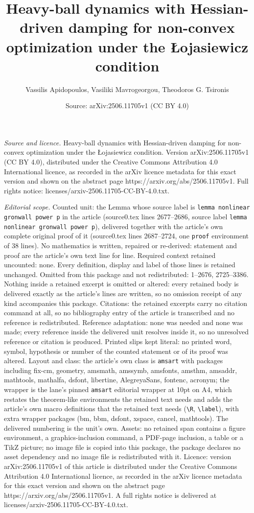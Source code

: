 \documentclass[10pt,a4paper]{amsart}
\title[Heavy-ball dynamics with Hessian-driven damping for non-conv]{Heavy-ball dynamics with Hessian-driven damping for non-convex optimization under the {\L}ojasiewicz condition}
\author{Vassilis Apidopoulos, Vasiliki Mavrogeorgou, Theodoros G. Tsironis}
\date{Source: arXiv:2506.11705v1 (CC BY 4.0)}
\begin{document}
\maketitle

\noindent\emph{Source and licence.} Heavy-ball dynamics with Hessian-driven damping for non-convex optimization under the {\L}ojasiewicz condition. Version arXiv:2506.11705v1 (CC BY 4.0), distributed under the Creative Commons Attribution 4.0 International licence, as recorded in the arXiv licence metadata for this exact version and shown on the abstract page https://arxiv.org/abs/2506.11705v1. Full rights notice: licenses/arxiv-2506.11705-CC-BY-4.0.txt.\par\smallskip

\noindent\textit{Editorial scope.} Counted unit: the Lemma whose source label is \texttt{lemma nonlinear gronwall power p} in the article (source0.tex lines 2677--2686, source label \texttt{lemma nonlinear gronwall power p}), delivered together with the article's own complete original proof of it (source0.tex lines 2687--2724, one \texttt{proof} environment of 38 lines). No mathematics is written, repaired or re-derived: statement and proof are the article's own text line for line. Required context retained uncounted: none. Every definition, display and label of those lines is retained unchanged. Omitted from this package and not redistributed: 1--2676, 2725--3386. Nothing inside a retained excerpt is omitted or altered: every retained body is delivered exactly as the article's lines are written, so no omission receipt of any kind accompanies this package. Citations: the retained excerpts carry no citation command at all, so no bibliography entry of the article is transcribed and no reference is redistributed. Reference adaptation: none was needed and none was made; every reference inside the delivered unit resolves inside it, so no unresolved reference or citation is produced. Printed slips kept literal: no printed word, symbol, hypothesis or number of the counted statement or of its proof was altered. Layout and class: the article's own class is \texttt{amsart} with packages including fix-cm, geometry, amsmath, amssymb, amsfonts, amsthm, amsaddr, mathtools, mathalfa, dsfont, libertine, AlegreyaSans, fontenc, acronym; the wrapper is the lane's pinned \texttt{amsart} editorial wrapper at 10pt on A4, which restates the theorem-like environments the retained text needs and adds the article's own macro definitions that the retained text needs (\texttt{\textbackslash R}, \texttt{\textbackslash label}), with extra wrapper packages (bm, bbm, dsfont, xspace, cancel, mathtools). The delivered numbering is the unit's own. Assets: no retained span contains a figure environment, a graphics-inclusion command, a PDF-page inclusion, a table or a TikZ picture; no image file is copied into this package, the package declares no asset dependency and no image file is redistributed with it. Licence: version arXiv:2506.11705v1 of this article is distributed under the Creative Commons Attribution 4.0 International licence, as recorded in the arXiv licence metadata for this exact version and shown on the abstract page https://arxiv.org/abs/2506.11705v1. A full rights notice is delivered at licenses/arxiv-2506.11705-CC-BY-4.0.txt. 
\end{document}

